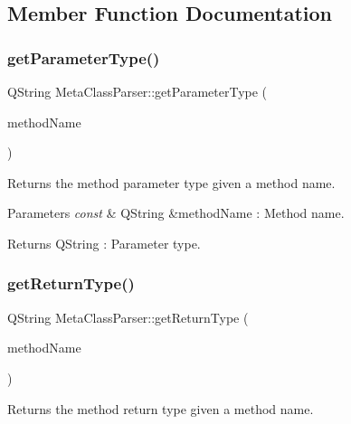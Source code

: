 \subsection{Member Function Documentation}
\mbox{\label{class_meta_class_parser_ada953748a39a39968054231128a08667}} 
\subsubsection{\texorpdfstring{get\+Parameter\+Type()}{getParameterType()}}
{\footnotesize\ttfamily Q\+String Meta\+Class\+Parser\+::get\+Parameter\+Type (\begin{DoxyParamCaption}\item[{const Q\+String \&}]{method\+Name }\end{DoxyParamCaption})}



Returns the method parameter type given a method name. 


\begin{DoxyParams}{Parameters}
{\em const} & Q\+String \&method\+Name \+: Method name. \\
\hline
\end{DoxyParams}
\begin{DoxyReturn}{Returns}
Q\+String \+: Parameter type. 
\end{DoxyReturn}
\mbox{\label{class_meta_class_parser_adf9eefe961550b4aaa9432532f5723f4}} 
\subsubsection{\texorpdfstring{get\+Return\+Type()}{getReturnType()}}
{\footnotesize\ttfamily Q\+String Meta\+Class\+Parser\+::get\+Return\+Type (\begin{DoxyParamCaption}\item[{const Q\+String \&}]{method\+Name }\end{DoxyParamCaption})}



Returns the method return type given a method name. 


